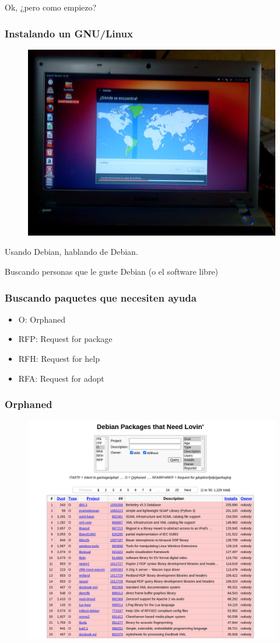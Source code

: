 \documentclass{beamer}
\begin{document}
\begin{frame}
 \centering
 \Huge Ok, ¿pero como empiezo?
\end{frame}
\begin{frame}
 \frametitle{Instalando un GNU/Linux}
    \begin{figure}
		\centering
		\includegraphics[width=0.7\linewidth]{images/ubuntu.jpg}
		\label{fig:Install Ubuntu}
	\end{figure}
\end{frame}

\begin{frame}
  \centering
  \Huge Usando Debian, hablando de Debian.
\end{frame}

\begin{frame}
  \centering
  \Huge Buscando personas que le guste Debian (o el software libre)
\end{frame}

\begin{frame}
\frametitle{Buscando paquetes que necesiten ayuda}
  \begin{itemize}
    \item O: Orphaned
    \item RFP: Request for package
    \item RFH: Request for help
    \item RFA: Request for adopt
  \end{itemize}
\end{frame}
\begin{frame}
 \frametitle{Orphaned}
    \begin{figure}
		\centering
		\includegraphics[width=0.7\linewidth]{images/orphaned}
		\label{fig:Orphaned}
	\end{figure}
\end{frame}
\end{document}
